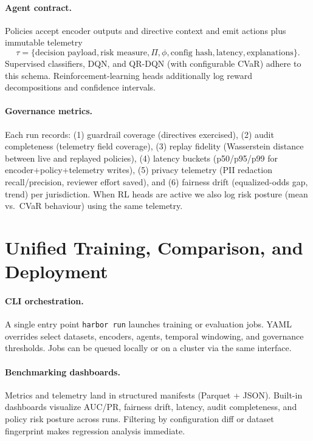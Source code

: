 \documentclass[letterpaper]{article}
\begin{document}
\paragraph{Agent contract.} Policies accept encoder outputs and directive context and emit actions plus immutable telemetry
\[
\tau = \{\text{decision payload}, \text{risk measure}, \Pi, \phi, \text{config hash}, \text{latency}, \text{explanations}\}.
\]
Supervised classifiers, DQN, and QR-DQN (with configurable CVaR) adhere to this schema. Reinforcement-learning heads additionally log reward decompositions and confidence intervals.

\paragraph{Governance metrics.} Each run records: (1) guardrail coverage (directives exercised), (2) audit completeness (telemetry field coverage), (3) replay fidelity (Wasserstein distance between live and replayed policies), (4) latency buckets (p50/p95/p99 for encoder+policy+telemetry writes), (5) privacy telemetry (PII redaction recall/precision, reviewer effort saved), and (6) fairness drift (equalized-odds gap, trend) per jurisdiction. When RL heads are active we also log risk posture (mean vs.\ CVaR behaviour) using the same telemetry.

\section{Unified Training, Comparison, and Deployment}
\label{sec:workflow}
\paragraph{CLI orchestration.} A single entry point \texttt{harbor run} launches training or evaluation jobs. YAML overrides select datasets, encoders, agents, temporal windowing, and governance thresholds. Jobs can be queued locally or on a cluster via the same interface.

\paragraph{Benchmarking dashboards.} Metrics and telemetry land in structured manifests (Parquet + JSON). Built-in dashboards visualize AUC/PR, fairness drift, latency, audit completeness, and policy risk posture across runs. Filtering by configuration diff or dataset fingerprint makes regression analysis immediate.
\end{document}
